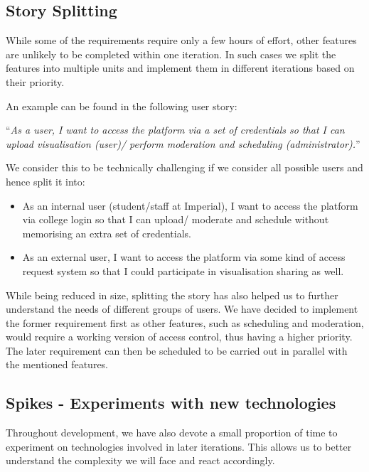 \documentclass[a4paper]{article}
\begin{document}
\subsection{Story Splitting}
While some of the requirements require only a few hours of effort, other features are unlikely to be completed within one iteration. In such cases we split the features into multiple units and implement them in different iterations based on their priority.

An example can be found in the following user story:
\begin{center}
``\textit{As a user, I want to access the platform via a set of
credentials so that I can upload visualisation (user)/ perform moderation and
scheduling (administrator).}''\\
\end{center}

We consider this to be technically challenging if we consider all possible users and hence split it into:

\begin{itemize}
  \item As an internal user (student/staff at Imperial), I want to access the 
        platform via college login so that I can upload/ moderate and schedule
        without memorising an extra set of credentials.
  \item As an external user, I want to access the platform via some kind
        of access request system so that I could participate in visualisation
        sharing as well. 
\end{itemize}

While being reduced in size, splitting the story has also helped us to 
further understand the needs
of different groups of users. We have decided to implement the former requirement
first as other features, such as scheduling and moderation, would require
a working version of access control, thus having a higher priority.
The later requirement can then be scheduled
to be carried out in parallel with the mentioned features.

\subsection{Spikes - Experiments with new technologies}
Throughout development, we have also devote a small proportion of time to
experiment on technologies involved in later iterations. This allows us to
better understand the complexity we will face and react accordingly.
\end{document}
